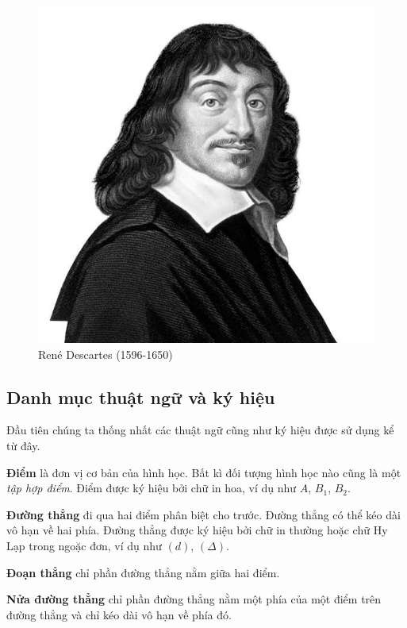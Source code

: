 \begin{figure}[ht]
	\centering
	\includegraphics[scale=0.5]{mathematicians/Descartes.jpg}
	\captionsetup{labelformat=empty}
	\caption{René Descartes (1596-1650)}
\end{figure}

\subsection*{Danh mục thuật ngữ và ký hiệu}

Đầu tiên chúng ta thống nhất các thuật ngữ cũng như ký hiệu được sử dụng kể từ đây.

\textbf{Điểm} là đơn vị cơ bản của hình học. Bất kì đối tượng hình học nào cũng là một \textit{tập hợp điểm}. Điểm được ký hiệu bởi chữ in hoa, ví dụ như $A$, $B_1$, $B_2$.

\textbf{Đường thẳng} đi qua hai điểm phân biệt cho trước. Đường thẳng có thể kéo dài vô hạn về hai phía. Đường thẳng được ký hiệu bởi chữ in thường hoặc chữ Hy Lạp trong ngoặc đơn, ví dụ như $(d)$, $(\Delta)$.

\textbf{Đoạn thẳng} chỉ phần đường thẳng nằm giữa hai điểm.

\textbf{Nửa đường thẳng} chỉ phần đường thẳng nằm một phía của một điểm trên đường thẳng và chỉ kéo dài vô hạn về phía đó.

